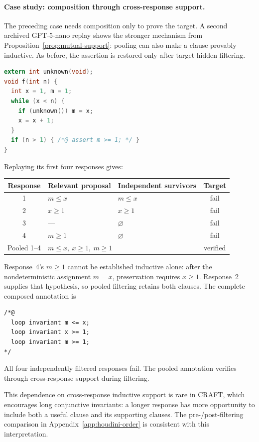 \noindent\begin{minipage}{\textwidth}
\paragraph{Case study: composition through cross-response support.}
The preceding case needs composition only to prove the target.  A second
archived GPT-5-nano replay shows the stronger mechanism from
Proposition~\ref{prop:mutual-support}: pooling can also make a clause provably
inductive.  As before, the assertion is restored only after target-hidden
filtering.

\begin{lstlisting}[language=C]
extern int unknown(void);
void f(int n) {
  int x = 1, m = 1;
  while (x < n) {
    if (unknown()) m = x;
    x = x + 1;
  }
  if (n > 1) { /*@ assert m >= 1; */ }
}
\end{lstlisting}

Replaying its first four responses gives:
\begin{center}
\small
\begin{tabular}{cllc}
\toprule
\rowcolor{algobg}
Response & Relevant proposal & Independent survivors & Target \\
\midrule
1 & \(m\leq x\) & \(m\leq x\) & fail \\
2 & \(x\geq1\) & \(x\geq1\) & fail \\
3 & --- & \(\varnothing\) & fail \\
4 & \(m\geq1\) & \(\varnothing\) & fail \\
\midrule
Pooled 1--4 & \multicolumn{2}{l}{\(m\leq x,\ x\geq1,\ m\geq1\)} & verified \\
\bottomrule
\end{tabular}
\end{center}

Response~4's \(m\geq1\) cannot be established inductive alone: after the
nondeterministic assignment \(m=x\), preservation requires \(x\geq1\).
Response~2 supplies that hypothesis, so pooled filtering retains both clauses.
The complete composed annotation is
\begin{lstlisting}
/*@
  loop invariant m <= x;
  loop invariant x >= 1;
  loop invariant m >= 1;
*/
\end{lstlisting}
All four independently filtered responses fail. The pooled annotation verifies
through cross-response support during filtering.
\end{minipage}

This dependence on cross-response inductive support is rare in CRAFT,
which encourages long conjunctive invariants: a longer response has more
opportunity to include both a useful clause and its supporting clauses.
The pre-/post-filtering comparison in Appendix~\ref{app:houdini-order}
is consistent with this interpretation.

